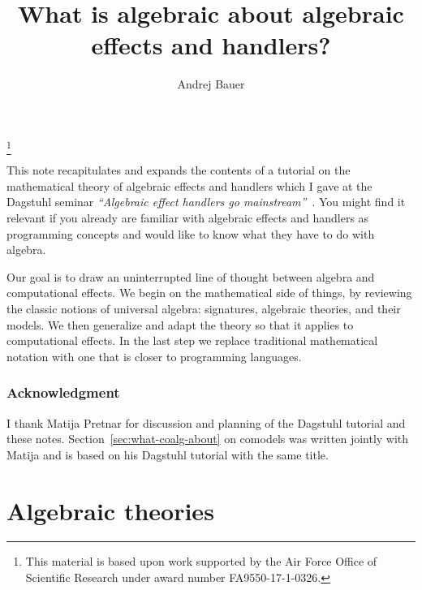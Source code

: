 \documentclass{amsart}
\begin{document}
\title{What is algebraic about algebraic effects and handlers?}

\author{Andrej Bauer}
\address{Andrej Bauer\\
Faculty of mathematics and Physics\\
University of Ljubljana\\
Jadranska 19\\
1000 Ljubljana\\
Slovenia}
\thanks{This material is based upon work supported by the Air Force Office of
  Scientific Research under award number FA9550-17-1-0326.}


\maketitle

This note recapitulates and expands the contents of a tutorial on the
mathematical theory of algebraic effects and handlers which I gave at the
Dagstuhl seminar \emph{``Algebraic effect handlers go
  mainstream''}~\cite{chandrasekaran18:_algeb}. You might find it relevant if
you already are familiar with algebraic effects and handlers as programming
concepts and would like to know what they have to do with algebra.

Our goal is to draw an uninterrupted line of thought between algebra and
computational effects. We begin on the mathematical side of things, by reviewing
the classic notions of universal algebra: signatures, algebraic theories, and
their models. We then generalize and adapt the theory so that it applies to
computational effects. In the last step we replace traditional mathematical
notation with one that is closer to programming languages.

\subsubsection*{Acknowledgment}

I thank Matija Pretnar for discussion and planning of the Dagstuhl tutorial and
these notes. Section~\ref{sec:what-coalg-about} on comodels was written jointly
with Matija and is based on his Dagstuhl tutorial with the same title.


\section{Algebraic theories}
\label{sec:algebraic-theories}
\end{document}
